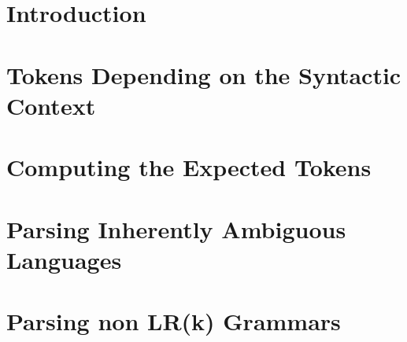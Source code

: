 \documentclass{llncs}
\begin{document}
\begin{abstract}

\end{abstract}

\section{Introduction}


%

%

%

%

\section{Tokens Depending on the Syntactic Context}
\label{section:pli}


\section{Computing the Expected Tokens}
\label{section:expected}


\section{Parsing Inherently Ambiguous Languages}
\label{section:ambiguous}


\section{Parsing non LR(k) Grammars}
\label{section:nolrk}

\end{document}
